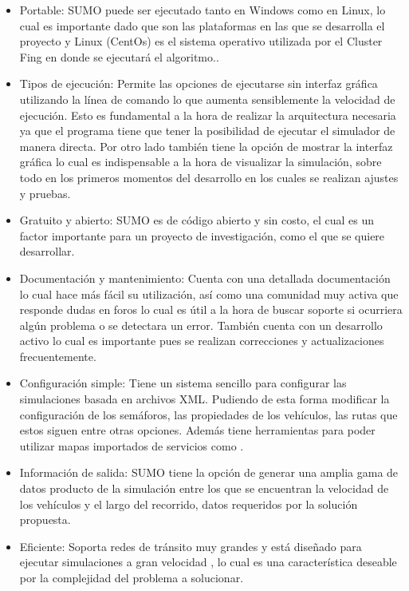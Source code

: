 \begin{itemize}
	\item Portable: SUMO puede ser ejecutado tanto en Windows como en Linux, lo cual es importante dado que son las plataformas en las que se desarrolla el proyecto y Linux (CentOs) es el sistema operativo utilizada por el Cluster Fing en donde se ejecutará el algoritmo..
	
	\item Tipos de ejecución: Permite las opciones de ejecutarse sin interfaz gráfica utilizando la línea de comando lo que aumenta sensiblemente la velocidad de ejecución. Esto es fundamental a la hora de realizar la arquitectura necesaria ya que el programa tiene que tener la posibilidad de ejecutar el simulador de manera directa. Por otro lado también tiene la opción de mostrar la interfaz gráfica lo cual es indispensable a la hora de visualizar la simulación, sobre todo en los primeros momentos del desarrollo en los cuales se realizan ajustes y pruebas.
	
	\item Gratuito y abierto: SUMO es de código abierto y sin costo, el cual es un factor importante para un proyecto de investigación, como el que se quiere desarrollar. 
	
	\item Documentación y mantenimiento: Cuenta con una detallada documentación lo cual hace más fácil su utilización, así como una comunidad muy activa que responde dudas en foros lo cual es útil a la hora de buscar soporte si ocurriera algún problema o se detectara un error. También cuenta con un desarrollo activo lo cual es importante pues se realizan correcciones y actualizaciones frecuentemente.
	
	\item Configuración simple: Tiene un sistema sencillo para configurar las simulaciones basada en archivos XML. Pudiendo de esta forma modificar la configuración de los semáforos, las propiedades de los vehículos, las rutas que estos siguen entre otras opciones. Además tiene herramientas para poder utilizar mapas importados de servicios como \citet{OSM}.
	
	\item Información de salida: SUMO tiene la opción de generar una amplia gama de datos producto de la simulación entre los que se encuentran la velocidad de los vehículos y el largo del recorrido, datos requeridos por la solución propuesta.
	
	\item Eficiente: Soporta redes de tránsito muy grandes y está diseñado para ejecutar simulaciones a gran velocidad \citep{sumo2014}, lo cual es una característica deseable por la complejidad del problema a solucionar.
	
\end{itemize}


